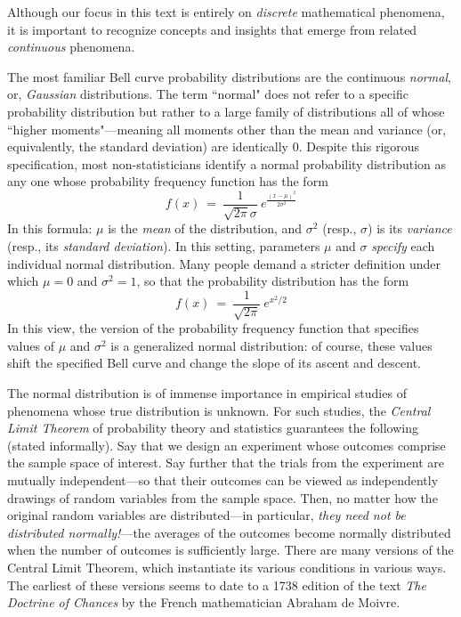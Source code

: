 Although our focus in this text is entirely on {\em discrete} mathematical phenomena, it is important to recognize concepts and insights that emerge from related {\em continuous} phenomena.

The most familiar Bell curve probability distributions are the continuous {\em normal}, or, {\it Gaussian} distributions.  The term ``normal" does not refer to a specific probability distribution but rather to a large family of distributions all of whose ``higher moments"---meaning all moments other than the mean and variance (or, equivalently, the standard deviation) are identically $0$.  Despite this rigorous specification, most non-statisticians identify a normal probability distribution as any one whose probability frequency function has the form
\[ f(x) \ = \ \frac{1}{\sqrt{2 \pi} \sigma} \ e^{\frac{(x - \mu)^2}{2 \sigma^2} } \]
In this formula: $\mu$ is the {\it mean} of the distribution, and $\sigma^2$ (resp., $\sigma$) is its {\it variance} (resp., its {\it standard deviation}).  In this setting, parameters $\mu$ and $\sigma$ {\em specify} each individual normal distribution.  Many people demand a stricter definition under which $\mu = 0$ and $\sigma^2 = 1$, so that the probability distribution has the form
\[ f(x) \ = \ \frac{1}{\sqrt{2 \pi}} \ e^{x^2/2} \]
In this view, the version of the probability frequency function that specifies values of $\mu$ and $\sigma^2$ is a generalized normal distribution: of course, these values shift the specified Bell curve and change the slope of its ascent and descent.

\bigskip

\noindent {}

\bigskip

The normal distribution is of immense importance in empirical studies of phenomena whose true distribution is unknown.  For such studies, the {\em Central Limit Theorem} of probability theory and statistics guarantees the following (stated informally).  Say that we design an experiment whose outcomes comprise the sample space of interest.  Say further that the trials from the experiment are mutually independent---so that their outcomes can be viewed as independently drawings of random variables from the sample space.  Then, no matter how the original random variables are distributed---in particular, {\em they need not be distributed normally!}---the averages of the outcomes become normally distributed when the number of outcomes is sufficiently large.  There are many versions of the Central Limit Theorem, which instantiate its various conditions in various ways.  The earliest of these versions seems to date to a 1738 edition of the text {\it The Doctrine of Chances} by the French mathematician Abraham de Moivre.

